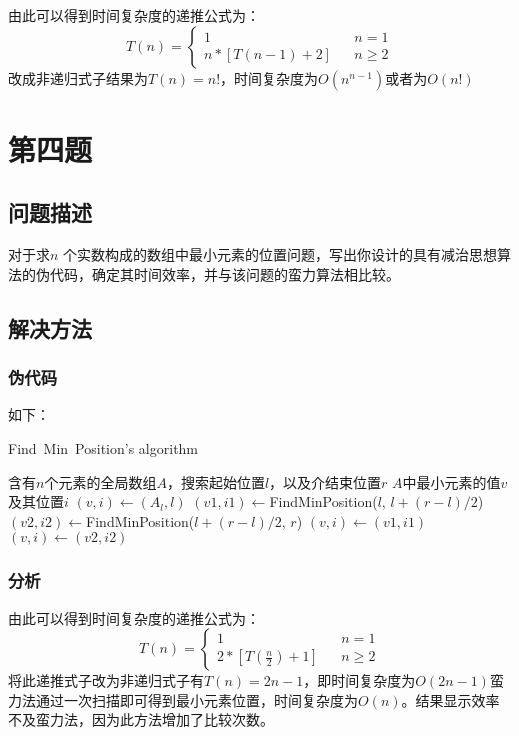 \documentclass[cs4size, punct, nospace, fancyhdr, fntef, UTF8]{ctexart}
\begin{document}
  由此可以得到时间复杂度的递推公式为：
  \begin{equation}\label{equ:3_1}
    T(n)=\left\{
    \begin{array}{lcl}
      1                     &      & {n=1}\\
      {n*[T(n-1)+2]}        &      & {n\ge 2}
  \end{array} \right.
  \end{equation}
  改成非递归式子结果为$T(n)=n!$，时间复杂度为$O(n^{n-1})$或者为$O(n!)$

  \section{第四题}
  \subsection{问题描述}
  对于求$n$ 个实数构成的数组中最小元素的位置问题，写出你设计的具有减治思想算法的伪代码，确定其时间效率，并与该问题的蛮力算法相比较。
  \subsection{解决方法}
  \subsubsection{伪代码}
  如下：
  \begin{algorithm}
    \caption{Find\ Min\ Position's algorithm}\label{alg:FindMinPosition}
  \begin{algorithmic}[1]
      \Require 含有$n$个元素的全局数组$A$，搜索起始位置$l$，以及介结束位置$r$  
      \Ensure $A$中最小元素的值$v$及其位置$i$
        \State $(v,i) \gets (A_l, l)$
      \EndIf
      \State $(v1, i1)\gets $FindMinPosition($l$, $l+(r-l)/2$)
      \State $(v2, i2)\gets $FindMinPosition($l+(r-l)/2$, $r$)
        \State $(v,i) \gets (v1, i1)$
      \Else
        \State $(v,i) \gets (v2, i2)$
      \EndIf
    \EndFunction
    \end{algorithmic}
    \end{algorithm}
  \subsubsection{分析}
  由此可以得到时间复杂度的递推公式为：
  \begin{equation}\label{equ:3_1}
    T(n)=\left\{
    \begin{array}{lcl}
      1                     &      & {n=1}\\
      {2*[T(\frac{n}{2})+1]}        &      & {n\ge 2}
  \end{array} \right.
  \end{equation}
  将此递推式子改为非递归式子有$T(n)=2n-1$，即时间复杂度为$O(2n-1)$蛮力法通过一次扫描即可得到最小元素位置，时间复杂度为$O(n)$。结果显示效率不及蛮力法，因为此方法增加了比较次数。
\end{document}
